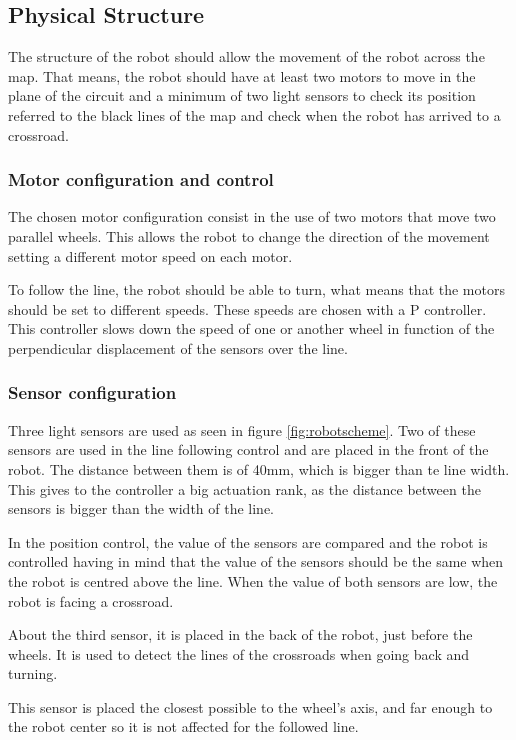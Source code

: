 \subsection{Physical Structure}
The structure of the robot should allow the movement of the robot across the map. 
That means, the robot should have at least two motors to move in the plane of the circuit and a minimum of two light sensors to check its position referred to the black lines of the map and check when the robot has arrived to a crossroad.

\subsubsection{Motor configuration and control}
The chosen motor configuration consist in the use of two motors that move two parallel wheels. 
This allows the robot to change the direction of the movement setting a different motor speed on each motor.

To follow the line, the robot should be able to turn, what means that the motors should be set to different speeds.
These speeds are chosen with a P controller.
This controller slows down the speed of one or another wheel in function of the perpendicular displacement of the sensors 
over the line. 


\subsubsection{Sensor configuration}

Three light sensors are used as seen in figure \ref{fig:robotscheme}. 
Two of these sensors are used in the line following control and are placed in the front of the robot.
The distance between them is of 40mm, which is bigger than te line width.
This gives to the controller a big actuation rank, as the distance between the sensors is bigger than the width of the line.

In the position control, the value of the sensors are compared and the robot is controlled having in mind that the value of the sensors should be the same when the robot is centred above the line.
When the value of both sensors are low, the robot is facing a crossroad.


About the third sensor, it is placed in the back of the robot, just before the wheels.
It is used to detect the lines of the crossroads when going back and turning.

This sensor is placed the closest possible to the wheel's axis, and far enough to the robot center so it is not affected
for the followed line.

